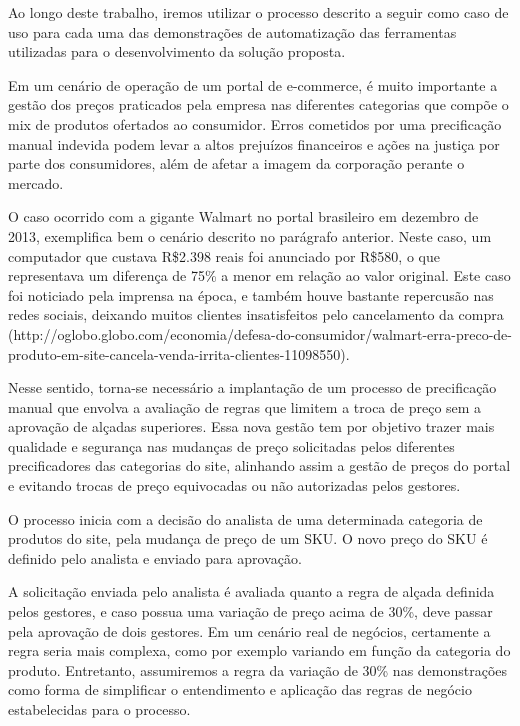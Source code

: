 Ao longo deste trabalho, iremos utilizar o processo descrito a seguir como caso de uso para cada uma das demonstrações de automatização das ferramentas utilizadas para o desenvolvimento da solução proposta.

Em um cenário de operação de um portal de e-commerce, é muito importante a gestão dos preços praticados pela empresa nas diferentes categorias que compõe o mix de produtos ofertados ao consumidor. Erros cometidos por uma precificação manual indevida podem levar a altos prejuízos financeiros e ações na justiça por parte dos consumidores, além de afetar a imagem da corporação perante o mercado. 

O caso ocorrido com a gigante Walmart no portal brasileiro em dezembro de 2013, exemplifica bem o cenário descrito no parágrafo anterior. Neste caso, um computador que custava R\$2.398 reais foi anunciado por R\$580, o que representava um diferença de 75\% a menor em relação ao valor original. Este caso foi noticiado pela imprensa na época, e também houve bastante repercusão nas redes sociais, deixando muitos clientes insatisfeitos pelo cancelamento da compra (http://oglobo.globo.com/economia/defesa-do-consumidor/walmart-erra-preco-de-produto-em-site-cancela-venda-irrita-clientes-11098550). 

Nesse sentido, torna-se necessário a implantação de um processo de precificação manual que envolva a avaliação de regras que limitem a troca de preço sem a aprovação de alçadas superiores. Essa nova gestão tem por objetivo trazer mais qualidade e segurança nas mudanças de preço solicitadas pelos diferentes precificadores das categorias do site, alinhando assim a gestão de preços do portal e evitando trocas de preço equivocadas ou não autorizadas pelos gestores.

O processo inicia com a decisão do analista de uma determinada categoria de produtos do site, pela mudança de preço de um SKU. O novo preço do SKU é definido pelo analista e enviado para aprovação.

A solicitação enviada pelo analista é avaliada quanto a regra de alçada definida pelos gestores, e caso possua uma variação de preço acima de 30\%, deve passar pela aprovação de dois gestores. Em um cenário real de negócios, certamente a regra seria mais complexa, como por exemplo variando em função da categoria do produto. Entretanto, assumiremos a regra da variação de 30\% nas demonstrações como forma de simplificar o entendimento e aplicação das regras de negócio estabelecidas para o processo.

